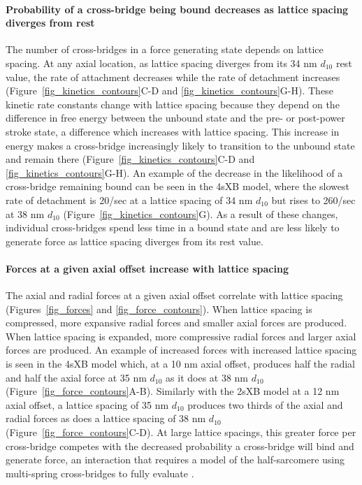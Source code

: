 \documentclass[10pt]{article}
\newcommand{\citep}[1]{\cite{#1}} %
\begin{document}
\paragraph{Probability of a cross-bridge being bound decreases as lattice spacing diverges from rest} %
The number of cross-bridges in a force generating state depends on lattice spacing. 
At any axial location, as lattice spacing diverges from its 34 nm $d_{10}$ rest value, the rate of attachment decreases while the rate of detachment increases (Figure~\ref{fig_kinetics_contours}C-D and \ref{fig_kinetics_contours}G-H). 
These kinetic rate constants change with lattice spacing because they depend on the difference in free energy between the unbound state and the pre- or post-power stroke state, a difference which increases with lattice spacing.
This increase in energy makes a cross-bridge increasingly likely to transition to the unbound state and remain there (Figure~\ref{fig_kinetics_contours}C-D and  \ref{fig_kinetics_contours}G-H). 
An example of the decrease in the likelihood of a cross-bridge remaining bound can be seen in the 4sXB model, where the slowest rate of detachment is 20/sec at a lattice spacing of 34 nm $d_{10}$ but rises to 260/sec at 38 nm $d_{10}$ (Figure~\ref{fig_kinetics_contours}G). 
As a result of these changes, individual cross-bridges spend less time in a bound state and are less likely to generate force as lattice spacing diverges from its rest value.

\paragraph{Forces at a given axial offset increase with lattice spacing} %
The axial and radial forces at a given axial offset correlate with lattice spacing (Figures~\ref{fig_forces} and \ref{fig_force_contours}).
When lattice spacing is compressed, more expansive radial forces and smaller axial forces are produced. 
When lattice spacing is expanded, more compressive radial forces and larger axial forces are produced. 
An example of increased forces with increased lattice spacing is seen in the 4sXB model which, at a 10 nm axial offset, produces half the radial and half the axial force at 35 nm $d_{10}$ as it does at 38 nm $d_{10}$ (Figure~\ref{fig_force_contours}A-B). 
Similarly with the 2sXB model at a 12 nm axial offset, a lattice spacing of 35 nm $d_{10}$ produces two thirds of the axial and radial forces as does a lattice spacing of 38 nm $d_{10}$ (Figure~\ref{fig_force_contours}C-D).
At large lattice spacings, this greater force per cross-bridge competes with the decreased probability a cross-bridge will bind and generate force, an interaction that requires a model of the half-sarcomere using multi-spring cross-bridges to fully evaluate \citep{Martyn2004}. 
\end{document}

